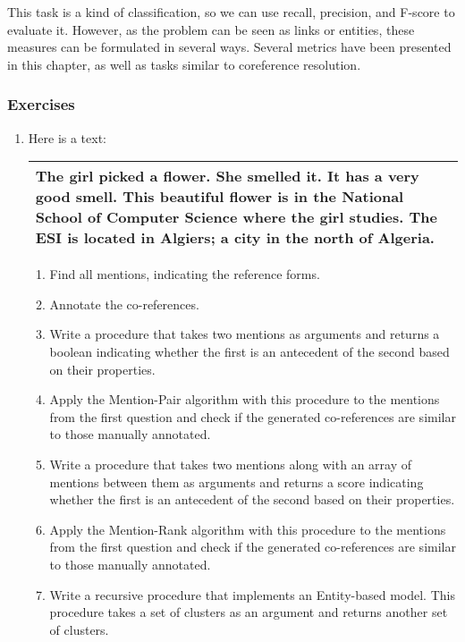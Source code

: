 \documentclass{KBook}
\begin{document}
This task is a kind of classification, so we can use recall, precision, and F-score to evaluate it. However, as the problem can be seen as links or entities, these measures can be formulated in several ways. Several metrics have been presented in this chapter, as well as tasks similar to coreference resolution.



\subsubsection*{Exercises}

\begin{enumerate}
	\item Here is a text:
	
	\begin{tabular}{|p{}|}
		\hline
		The girl picked a flower. 
		She smelled it. 
		It has a very good smell.
		This beautiful flower is in the National School of Computer Science where the girl studies.
		The ESI is located in Algiers; a city in the north of Algeria.\\
		\hline
	\end{tabular}
	
	\begin{enumerate}
		\item Find all mentions, indicating the reference forms.
		\item Annotate the co-references.
		\item Write a procedure that takes two mentions as arguments and returns a boolean indicating whether the first is an antecedent of the second based on their properties.
		\item Apply the Mention-Pair algorithm with this procedure to the mentions from the first question and check if the generated co-references are similar to those manually annotated.
		\item Write a procedure that takes two mentions along with an array of mentions between them as arguments and returns a score indicating whether the first is an antecedent of the second based on their properties.
		\item Apply the Mention-Rank algorithm with this procedure to the mentions from the first question and check if the generated co-references are similar to those manually annotated.
		\item Write a recursive procedure that implements an Entity-based model. This procedure takes a set of clusters as an argument and returns another set of clusters. 
	\end{enumerate}
\end{enumerate}
\end{document}
